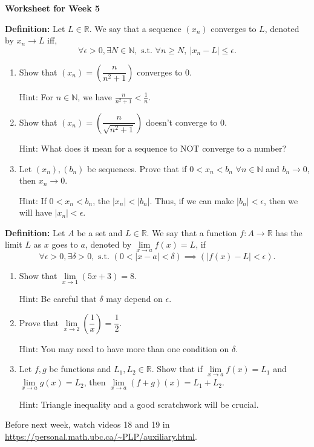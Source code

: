 \documentclass[12pt]{article}
\newcommand{\st}{\text{ s.t. }}
\begin{document}
\centerline{\bf\large Worksheet for Week 5}

\vspace{25pt}


\textbf{Definition:} Let $L\in\mathbb R$. We say that a sequence $(x_n)$ converges to $L$, denoted by $x_n\to L$ iff,
\[\forall \epsilon>0, \exists N\in\mathbb N, \st \forall n\geq N,\  |x_n-L|\leq \epsilon.\]

\begin{enumerate}

\item Show that $(x_n)=\left(\dfrac{n}{n^2+1} \right)$ converges to $0$.

Hint: For $n\in\mathbb N$, we have $\frac{n}{n^2+1}<\frac{1}{n}$.

\item Show that $(x_n)=\left(\dfrac{n}{\sqrt{n^2+1}}\right)$ doesn't converge to $0$.

Hint: What does it mean for a sequence to NOT converge to a number?

\item Let $(x_n), (b_n)$ be sequences. Prove that if $0<x_n<b_n$ $\forall n\in\mathbb N$ and $b_n\to 0$, then $x_n\to 0$.

Hint: If $0<x_n<b_n$, the $|x_n|<|b_n|$. Thus, if we can make $|b_n|<\epsilon$, then we will have $|x_n|<\epsilon$.

\end{enumerate}

\textbf{Definition:} Let $A$ be a set and $L\in\mathbb R$. We say that a function $f: A\to \mathbb R$ has the limit $L$ as $x$ goes to $a$, denoted by $\lim\limits_{x\to a}f(x)=L$, if
\[\forall \epsilon>0, \exists \delta>0, \st (0<|x-a|<\delta)\implies (|f(x)-L|<\epsilon). \]

\begin{enumerate}[resume]
\item Show that $\lim\limits_{x\to 1} (5x+3)=8$.

Hint: Be careful that $\delta$ may depend on $\epsilon$.

\item Prove that  $\lim\limits_{x\to 2}\left(\dfrac{1}{x}\right)=\dfrac 12$.

Hint: You may need to have more than one condition on $\delta$.

\item Let $f, g$ be functions and $L_1, L_2\in\mathbb R$. Show that if $\lim\limits_{x\to a}f(x)=L_1$ and $\lim\limits_{x\to a}g(x)=L_2$, then $\lim\limits_{x\to a}(f+g)(x)=L_1+L_2$.

Hint: Triangle inequality and a good scratchwork will be crucial.

\end{enumerate}

Before next week, watch videos 18 and 19 in \url{https://personal.math.ubc.ca/~PLP/auxiliary.html}.
\end{document}
